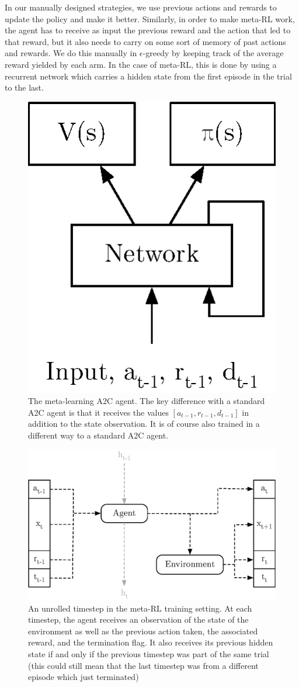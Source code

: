 In our manually designed strategies, we use previous actions and rewards
to update the policy and make it better. Similarly, in order to
make meta-RL work, the agent has to receive as input the previous reward
and the action that led to that reward, but it also needs to carry on some
sort of memory of past actions and rewards. We do this manually in 
$\epsilon$-greedy by keeping track of the average reward yielded by each arm.
In the case of meta-RL, this is done by using a recurrent network which
carries a hidden state from the first episode in the trial to the last.\\


\begin{figure}
	\centering
	\includegraphics[width=0.2\linewidth]{fig/a2c_meta.eps}
	\caption{The meta-learning A2C agent. The key difference with a
	standard A2C agent is that it receives the values 
	$[a_{t-1},r_{t-1},d_{t-1}]$ in addition to the state observation. It
	is of course also trained in a different way to a standard A2C agent.}
	\label{fig:a2c_meta}
\end{figure}

\begin{figure}
	\centering
	\includegraphics[width=0.6\linewidth]{fig/meta_rl_timestep.eps}
	\caption{An unrolled timestep in the meta-RL training setting. At each
	timestep, the agent receives an observation of the state of the
	environment as well as the previous action taken, the associated reward,
	and the termination flag. It also receives its previous hidden state
	if and only if the previous timestep was part of the same trial (this
	could still mean that the last timestep was from a different episode
	which just terminated)}
	\label{fig:meta_rl_timestep}
\end{figure}



